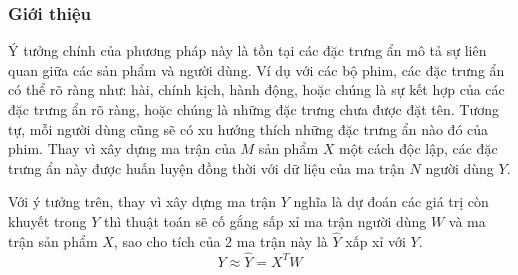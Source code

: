 \subsubsection{Giới thiệu}
Ý tưởng chính của phương pháp này là tồn tại các đặc trưng ẩn mô tả sự liên quan
giữa các sản phẩm và người dùng. Ví dụ với các bộ phim, các đặc trưng ẩn có thể rõ 
ràng như: hài, chính kịch, hành động, hoặc chúng là sự kết hợp của các đặc trưng ẩn rõ
ràng, hoặc chúng là những đặc trưng chưa được đặt tên. Tương tự, mỗi người dùng cũng
sẽ có xu hướng thích những đặc trưng ẩn nào đó của phim. Thay vì xây dựng ma trận
của $M$ sản phẩm $X$ một cách độc lập, các đặc trưng ẩn này được huấn luyện đồng thời
với dữ liệu của ma trận $N$ người dùng $Y$.

Với ý tưởng trên, thay vì xây dựng ma trận $Y$ nghĩa là dự đoán các giá trị còn khuyết
trong $Y$ thì thuật toán sẽ cố gắng sấp xỉ ma trận người dùng $W$ và ma trận sản phẩm $X$,
sao cho tích của 2 ma trận này là $\hat{Y}$ xấp xỉ với $Y$.
$$Y \approx \hat{Y} = X^TW$$